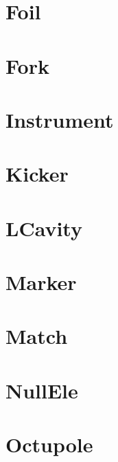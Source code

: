 \section{Foil}
\label{s:foil}


\section{Fork}
\label{s:fork}


\section{Instrument}
\label{s:instrument}


\section{Kicker}
\label{s:kicker}


\section{LCavity}
\label{s:lcav}


\section{Marker}
\label{s:marker}


\section{Match}
\label{s:match}


\section{NullEle}
\label{s:nullele}


\section{Octupole}
\label{s:oct}


